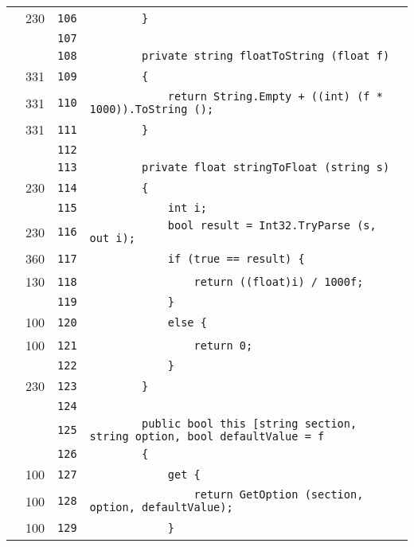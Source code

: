 \documentclass[a4paper,10pt]{article}
\begin{document}
\begin{longtable}[l]{lrrl}
\cellcolor{green} & 230 & \verb~106~ & \verb~        }~\\
\cellcolor{gray} &  & \verb~107~ & \verb~~\\
\cellcolor{gray} &  & \verb~108~ & \verb~        private string floatToString (float f)~\\
\cellcolor{green} & 331 & \verb~109~ & \verb~        {~\\
\cellcolor{green} & 331 & \verb~110~ & \verb~            return String.Empty + ((int) (f * 1000)).ToString ();~\\
\cellcolor{green} & 331 & \verb~111~ & \verb~        }~\\
\cellcolor{gray} &  & \verb~112~ & \verb~~\\
\cellcolor{gray} &  & \verb~113~ & \verb~        private float stringToFloat (string s)~\\
\cellcolor{green} & 230 & \verb~114~ & \verb~        {~\\
\cellcolor{gray} &  & \verb~115~ & \verb~            int i;~\\
\cellcolor{green} & 230 & \verb~116~ & \verb~            bool result = Int32.TryParse (s, out i);~\\
\cellcolor{green} & 360 & \verb~117~ & \verb~            if (true == result) {~\\
\cellcolor{green} & 130 & \verb~118~ & \verb~                return ((float)i) / 1000f;~\\
\cellcolor{gray} &  & \verb~119~ & \verb~            }~\\
\cellcolor{green} & 100 & \verb~120~ & \verb~            else {~\\
\cellcolor{green} & 100 & \verb~121~ & \verb~                return 0;~\\
\cellcolor{gray} &  & \verb~122~ & \verb~            }~\\
\cellcolor{green} & 230 & \verb~123~ & \verb~        }~\\
\cellcolor{gray} &  & \verb~124~ & \verb~~\\
\cellcolor{gray} &  & \verb~125~ & \verb~        public bool this [string section, string option, bool defaultValue = f~\\
\cellcolor{gray} &  & \verb~126~ & \verb~        {~\\
\cellcolor{green} & 100 & \verb~127~ & \verb~            get {~\\
\cellcolor{green} & 100 & \verb~128~ & \verb~                return GetOption (section, option, defaultValue);~\\
\cellcolor{green} & 100 & \verb~129~ & \verb~            }~\\

\end{longtable}
\end{document}
